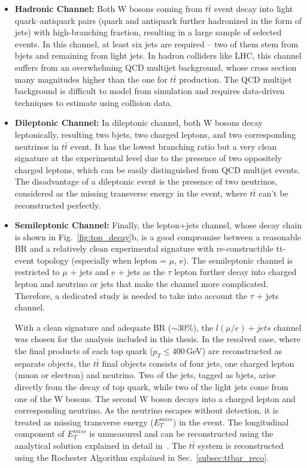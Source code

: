 \begin{itemize}
\item {\textbf{Hadronic Channel:}}
Both W bosons coming from $t\bar{t}$ event decay into light quark–antiquark pairs (quark and antiquark further hadronized in the form of jets) with high-branching fraction, resulting in a large sample of selected events. In this channel, at least six jets are required – two of them stem from bjets and remaining from light jets. In hadron colliders like LHC, this channel suffers from an overwhelming QCD multijet background, whose cross section many magnitudes higher than the one for $t\bar{t}$ production. The QCD multijet background is difficult to model from simulation and requires data-driven techniques to estimate using collision data.
\item{\textbf{Dileptonic Channel:}}
In dileptonic channel, both W bosons decay leptonically, resulting two bjets, two charged leptons, and two corresponding neutrinos in $t\bar{t}$ event. It has the lowest branching ratio but a very clean signature at the experimental level due to the presence of two oppositely charged leptons, which can be easily distinguished from QCD multijet events. The disadvantage of a dileptonic event is the presence of two neutrinos, considered as the missing transverse energy in the event, where $t\bar{t}$ can’t be reconstructed perfectly. 
\item{\textbf{Semileptonic Channel:}}
Finally, the lepton+jets channel, whose decay chain is shown in Fig.~\ref{fig:top_decay}b, is a good compromise between a reasonable BR and a relatively clean experimental signature with re-constructible tt-event topology (especially when lepton = $\mu$, e). The semileptonic channel is restricted to $\mu$ + jets and e + jets as the $\tau$ lepton further decay into charged lepton and neutrino or jets that make the channel more complicated. Therefore, a dedicated study is needed to take into account the $\tau$ + jets channel.
 
With a clean signature and adequate BR ($\sim$30\%), the $l(\mu/e)+jets$ channel was chosen for the analysis included in this thesis. In the resolved case, where the final products of each top quark ($p_{T} \le 400$\,GeV) are reconstructed as separate objects, the $t\bar{t}$ final objects consists of four jets, one charged lepton (muon or electron) and neutrino. Two of the jets, tagged as bjets, arise directly from the decay of top quark, while two of the light jets come from one of the W bosons. The second W boson decays into a charged lepton and corresponding neutrino. As the neutrino escapes without detection, it is treated as missing transverse energy ($E^{miss}_{T}$) in the event. The longitudinal component of $E^{miss}_{T}$ is unmeasured and can be reconstructed using the analytical solution explained in detail in~\cite{Betchart:2013nba}. The $t\bar{t}$ system is reconstructed using the Rochester Algorithm explained in Sec.~\ref{subsec:ttbar_reco}.     
\end{itemize}
